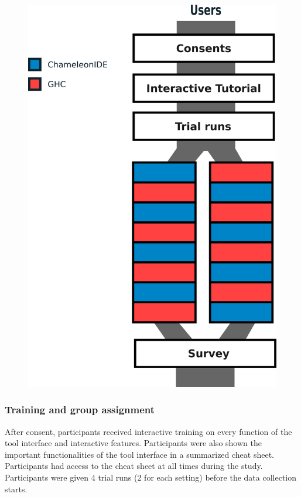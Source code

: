 \begin{figure}[h]
    \centering
    \includegraphics[width=\linewidth]{images/study-process.png}
    \caption{}
    \label{fig:study-process}
\end{figure}

\subsubsection*{\textbf{Training and group assignment}}
After consent, participants received interactive training on every function of the tool interface and interactive features. Participants were also shown the important functionalities of the tool interface in a summarized cheat sheet. Participants had access to the cheat sheet at all times during the study. Participants were given 4 trial runs (2 for each setting) before the data collection starts. 

